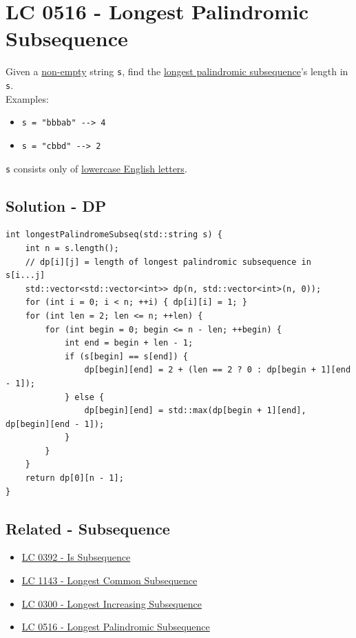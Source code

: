 \section{LC 0516 - Longest Palindromic Subsequence}\label{lc0516}
Given a \ul{non-empty} string {\colorbox{CodeBackground}{\lstinline|s|}}, find the \ul{longest palindromic subsequence}'s length in {\colorbox{CodeBackground}{\lstinline|s|}}. \\

Examples:
\begin{itemize}
	\item {\colorbox{CodeBackground}{\lstinline|s = "bbbab" --> 4|}}
	\item {\colorbox{CodeBackground}{\lstinline|s = "cbbd" --> 2|}}
\end{itemize}

{\colorbox{CodeBackground}{\lstinline|s|}} consists only of \ul{lowercase English letters}.\\

\subsection*{Solution - DP}
\begin{lstlisting}
int longestPalindromeSubseq(std::string s) {
	int n = s.length();
	// dp[i][j] = length of longest palindromic subsequence in s[i...j]
	std::vector<std::vector<int>> dp(n, std::vector<int>(n, 0));
	for (int i = 0; i < n; ++i) { dp[i][i] = 1; }
	for (int len = 2; len <= n; ++len) {
		for (int begin = 0; begin <= n - len; ++begin) {
			int end = begin + len - 1;
			if (s[begin] == s[end]) {
				dp[begin][end] = 2 + (len == 2 ? 0 : dp[begin + 1][end - 1]);
			} else {
				dp[begin][end] = std::max(dp[begin + 1][end], dp[begin][end - 1]);
			}
		}
	}
	return dp[0][n - 1];
}
\end{lstlisting}

\subsection*{Related - Subsequence}
\begin{itemize}
	\item \hyperref[lc0392]{LC 0392 - Is Subsequence}
	\item \hyperref[lc1143]{LC 1143 - Longest Common Subsequence}
	\item \hyperref[lc0300]{LC 0300 - Longest Increasing Subsequence}
	\item \hyperref[lc0516]{LC 0516 - Longest Palindromic Subsequence}
\end{itemize}

